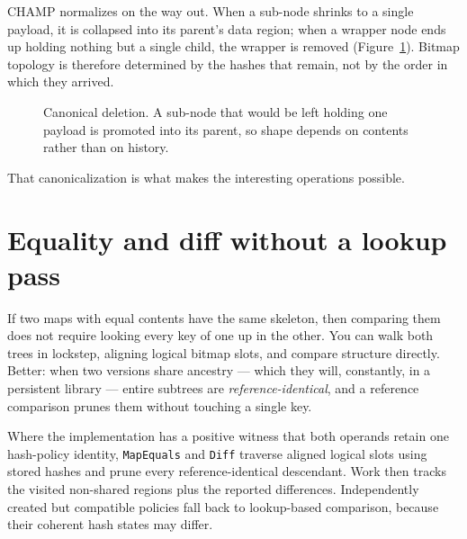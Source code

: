 \documentclass[11pt,twoside,openright]{book}
\newcommand{\code}[1]{\texorpdfstring{\textcolor{d7ink}{\texttt{#1}}}{#1}}
\begin{document}
CHAMP normalizes on the way out. When a sub-node shrinks to a single payload, it
is collapsed into its parent's data region; when a wrapper node ends up holding
nothing but a single child, the wrapper is removed (Figure~\ref{fig:champdelete}).
Bitmap topology is therefore determined by the hashes that remain, not by the
order in which they arrived.

\begin{figure}[htbp]
\centering
{}
\caption{Canonical deletion. A sub-node that would be left holding one payload is
promoted into its parent, so shape depends on contents rather than on history.}
\label{fig:champdelete}
\end{figure}

That canonicalization is what makes the interesting operations possible.

\section{Equality and diff without a lookup pass}

If two maps with equal contents have the same skeleton, then comparing them does
not require looking every key of one up in the other. You can walk both trees in
lockstep, aligning logical bitmap slots, and compare structure directly.
Better: when two versions share ancestry --- which they will, constantly, in a
persistent library --- entire subtrees are \emph{reference-identical}, and a
reference comparison prunes them without touching a single key.

\begin{contractbox}
Where the implementation has a positive witness that both operands retain one
hash-policy identity, \code{MapEquals} and \code{Diff} traverse aligned logical
slots using stored hashes and prune every reference-identical descendant. Work
then tracks the visited non-shared regions plus the reported differences.
Independently created but compatible policies fall back to lookup-based
comparison, because their coherent hash states may differ.
\end{contractbox}
\end{document}

